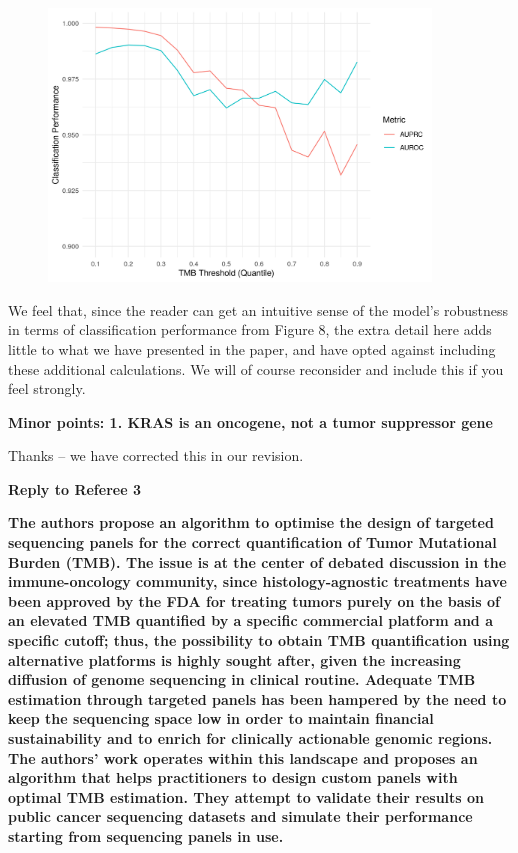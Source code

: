 \documentclass[12pt]{article}
\begin{document}
\begin{figure}[htbp]
\centering
\includegraphics[width=4in]{../../results/figures/quantile_thresholds_fig.png}
\end{figure} 

We feel that, since the reader can get an intuitive sense of the model's robustness in terms of classification performance from Figure 8, the extra detail here adds little to what we have presented in the paper, and have opted against including these additional calculations.  We will of course reconsider and include this if you feel strongly.  

\textbf{Minor points: 1. KRAS is an oncogene, not a tumor suppressor gene}

Thanks -- we have corrected this in our revision. 

\begin{thebibliography}{75}

\end{thebibliography}

\clearpage

{\large \textbf{Reply to Referee 3}}

\textbf{The authors propose an algorithm to optimise the design of targeted sequencing panels for the correct quantification of Tumor Mutational Burden (TMB). The issue is at the center of debated discussion in the immune-oncology community, since histology-agnostic treatments have been approved by the FDA for treating tumors purely on the basis of an elevated TMB quantified by a specific commercial platform and a specific cutoff; thus, the possibility to obtain TMB quantification using alternative platforms is highly sought after, given the increasing diffusion of genome sequencing in clinical routine. Adequate TMB estimation through targeted panels has been hampered by the need to keep the sequencing space low in order to maintain financial sustainability and to enrich for clinically actionable genomic regions. The authors’ work operates within this landscape and proposes an algorithm that helps practitioners to design custom panels with optimal TMB estimation. They attempt to
validate their results on public cancer sequencing datasets and simulate their performance starting from sequencing panels in use.}
\end{document}
